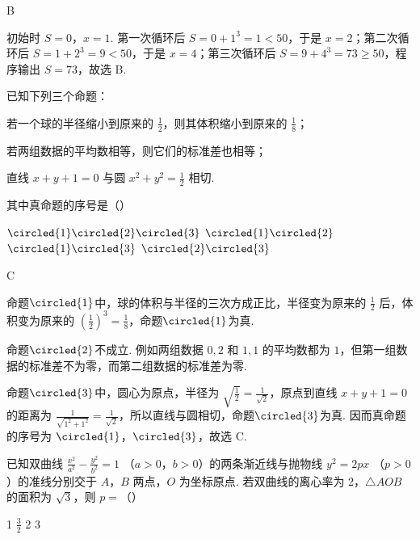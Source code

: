 \begin{answer}
B
\end{answer}

\begin{solution}
初始时 \(S=0\)，\(x=1\). 第一次循环后 \(S=0+1^3=1<50\)，于是 \(x=2\)；第二次循环后 \(S=1+2^3=9<50\)，于是 \(x=4\)；第三次循环后 \(S=9+4^3=73\geqslant 50\)，程序输出 \(S=73\)，故选 B.
\end{solution}

\begin{problem}
已知下列三个命题：

\begin{circlelist}
\item 若一个球的半径缩小到原来的 \(\frac{1}{2}\)，则其体积缩小到原来的 \(\frac{1}{8}\)；
\item 若两组数据的平均数相等，则它们的标准差也相等；
\item 直线 \(x + y + 1 = 0\) 与圆 \(x^{2} + y^{2} = \frac{1}{2}\) 相切.
\end{circlelist}

其中真命题的序号是（\quad）

\choices
    {\(\circled{1}\circled{2}\circled{3}\)}
    {\(\circled{1}\circled{2}\)}
    {\(\circled{1}\circled{3}\)}
    {\(\circled{2}\circled{3}\)}
\end{problem}

\begin{answer}
C
\end{answer}

\begin{solution}
命题\(\circled{1}\)中，球的体积与半径的三次方成正比，半径变为原来的 \(\frac{1}{2}\) 后，体积变为原来的 \(\left(\frac{1}{2}\right)^3=\frac{1}{8}\)，命题\(\circled{1}\)为真.

命题\(\circled{2}\)不成立. 例如两组数据 \(0,2\) 和 \(1,1\) 的平均数都为 \(1\)，但第一组数据的标准差不为零，而第二组数据的标准差为零.

命题\(\circled{3}\)中，圆心为原点，半径为 \(\sqrt{\frac{1}{2}}=\frac{1}{\sqrt{2}}\)，原点到直线 \(x+y+1=0\) 的距离为 \(\frac{1}{\sqrt{1^2+1^2}}=\frac{1}{\sqrt{2}}\)，所以直线与圆相切，命题\(\circled{3}\)为真. 因而真命题的序号为 \(\circled{1}\)，\(\circled{3}\)，故选 C.
\end{solution}

\begin{problem}
已知双曲线 \(\frac{x^2}{a^2} - \frac{y^2}{b^2} = 1 \) （\(a > 0\)，\(b > 0\)）的两条渐近线与抛物线 \(y^2 = 2px\) （\(p > 0\)）的准线分别交于 \(A\)，\(B\) 两点，\(O\) 为坐标原点. 若双曲线的离心率为 2，\(\triangle AOB\) 的面积为 \(\sqrt{3}\)，则 \(p =\)（\quad）

\choices
    {1}
    {\(\frac{3}{2}\)}
    {2}
    {3}
\end{problem}

